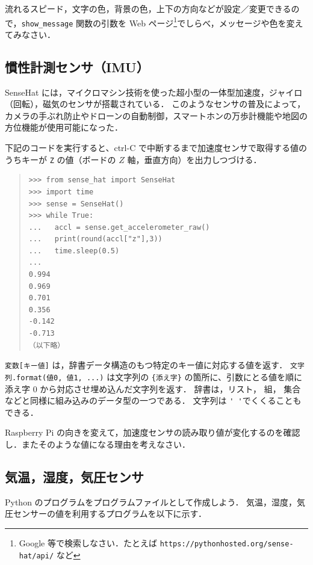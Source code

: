 \documentclass[11pt,a4,epsf]{article}
\begin{document}
\begin{excercise}
流れるスピード，文字の色，背景の色，上下の方向などが設定／変更できるので，\verb+show_message+ 関数の引数を Web ページ\footnote{Google 等で検索しなさい．たとえば {\tt https://pythonhosted.org/sense-hat/api/} など}でしらべ，メッセージや色を変えてみなさい．
\end{excercise}

\subsection{慣性計測センサ（IMU）}

SenseHat には，マイクロマシン技術を使った超小型の一体型加速度，ジャイロ（回転），磁気のセンサが搭載されている．
このようなセンサの普及によって，カメラの手ぶれ防止やドローンの自動制御，スマートホンの万歩計機能や地図の方位機能が使用可能になった．

下記のコードを実行すると、ctrl-C で中断するまで加速度センサで取得する値のうちキーが \verb+Z+ の値（ボードの $Z$ 軸，垂直方向）を出力しつづける．
\begin{quote}
\small
\begin{verbatim}
>>> from sense_hat import SenseHat 
>>> import time
>>> sense = SenseHat() 
>>> while True:
...   accl = sense.get_accelerometer_raw()
...   print(round(accl["z"],3))
...   time.sleep(0.5)
... 
0.994
0.969
0.701
0.356
-0.142
-0.713
（以下略）
\end{verbatim}
\end{quote}
\verb+変数[キー値]+ は，辞書データ構造のもつ特定のキー値に対応する値を返す．
\verb+文字列.format(値0, 値1, ...)+ は文字列の \verb+{添え字}+ の箇所に、引数にとる値を順に添え字 0 から対応させ埋め込んだ文字列を返す．
辞書は，リスト， 組， 集合などと同様に組み込みのデータ型の一つである．
文字列は \verb+' '+でくくることもできる．

\begin{excercise}
Raspberry Pi の向きを変えて，加速度センサの読み取り値が変化するのを確認し．またそのような値になる理由を考えなさい．
\end{excercise}

\subsection{気温，湿度，気圧センサ}

Python のプログラムをプログラムファイルとして作成しよう．
気温，湿度，気圧センサーの値を利用するプログラムを以下に示す．
\end{document}
